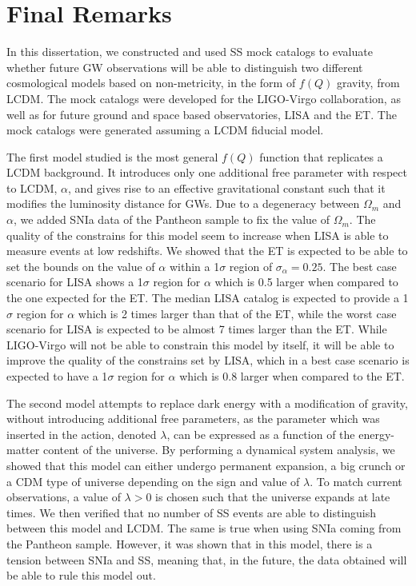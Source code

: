 \chapter{Final Remarks}
\label{chap:final-remarks}

In this dissertation, we constructed and used \gls{SS} mock catalogs to evaluate whether future \gls{GW} observations will be able to distinguish two different cosmological models based on non-metricity, in the form of $f(Q)$ gravity, from \gls{LCDM}. The mock catalogs were developed for the \gls{LIGO}-Virgo collaboration, as well as for future ground and space based observatories, \gls{LISA} and the \gls{ET}. The mock catalogs were generated assuming a \gls{LCDM} fiducial model.

The first model studied is the most general $f(Q)$ function that replicates a \gls{LCDM} background. It introduces only one additional free parameter with respect to \gls{LCDM}, $\alpha$, and gives rise to an effective gravitational constant such that it modifies the luminosity distance for \glspl{GW}. Due to a degeneracy between $\Omega_m$ and $\alpha$, we added \gls{SNIa} data of the Pantheon sample to fix the value of $\Omega_m$. The quality of the constrains for this model seem to increase when \gls{LISA} is able to measure events at low redshifts. We showed that the \gls{ET} is expected to be able to set the bounds on the value of $\alpha$ within a 1$\sigma$ region of $\sigma_\alpha = 0.25$. The best case scenario for \gls{LISA} shows a 1$\sigma$ region for $\alpha$ which is 0.5 larger when compared to the one expected for the \gls{ET}. The median \gls{LISA} catalog is expected to provide a 1$\sigma$ region for $\alpha$ which is 2 times larger than that of the \gls{ET}, while the worst case scenario for \gls{LISA} is expected to be almost 7 times larger than the \gls{ET}. While \gls{LIGO}-Virgo will not be able to constrain this model by itself, it will be able to improve the quality of the constrains set by \gls{LISA}, which in a best case scenario is expected to have a 1$\sigma$ region for $\alpha$ which is 0.8 larger when compared to the \gls{ET}.

The second model attempts to replace dark energy with a modification of gravity, without introducing additional free parameters, as the parameter which was inserted in the action, denoted $\lambda$, can be expressed as a function of the energy-matter content of the universe. By performing a dynamical system analysis, we showed that this model can either undergo permanent expansion, a big crunch or a \gls{CDM} type of universe depending on the sign and value of $\lambda$. To match current observations, a value of $\lambda > 0$ is chosen such that the universe expands at late times. We then verified that no number of \gls{SS} events are able to distinguish between this model and \gls{LCDM}. The same is true when using \gls{SNIa} coming from the Pantheon sample. However, it was shown that in this model, there is a tension between \gls{SNIa} and \gls{SS}, meaning that, in the future, the data obtained will be able to rule this model out.

